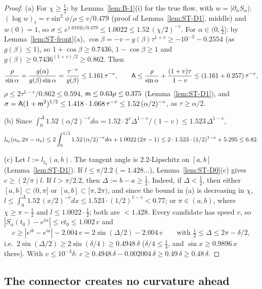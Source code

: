 \begin{proof}
(a) For $\chi\ge\frac12$: by Lemma~\ref{lem:B-1}(i) for the true flow, with $w=|\partial_\alpha S_\alpha|$:
$(\log w)_t=v\sin^2\!\phi/\rho\le v/0.479$ (proof of Lemma~\ref{lem:ST-D1}, middle) and $w(0)=1$, so
$\sigma\le e^{1.0102v/0.479}\le1.0022\le1.52\,(\chi/2)^{-v}$. For $\alpha\in(0,\frac12]$: by Lemma~\ref{lem:ST-front}(a),
$\cos\beta=-v-g(\beta)\tau^{1+v}\ge-10^{-3}-0.2554$ (as $g(\beta)\le1$), so $1+\cos\beta\ge0.7436$, $1-\cos\beta\ge1$ and
$g(\beta)\ge0.7436^{(1+v)/2}\ge0.862$. Then
\[
\frac\rho{\sin\alpha}=\frac{g(\alpha)}{g(\beta)\sin\alpha}=\frac{\tau^{-v}}{g(\beta)}\le1.161\,\tau^{-v},\qquad
\mathsf A\le\frac\rho{\sin\alpha}+\frac{(1+v)\tau}{1-v}\le(1.161+0.257)\,\tau^{-v},
\]
$\rho\le2\tau^{1-v}/0.862\le0.594$, $\mathsf m\le0.63\rho\le0.375$ (Lemma~\ref{lem:ST-D1}), and
$\sigma=\mathsf A(1+\mathsf m^2)^{1/2}\le1.418\cdot1.068\,\tau^{-v}\le1.52\,(\alpha/2)^{-v}$, as $\tau\ge\alpha/2$.

(b) Since $\int_0^\Delta1.52\,(\alpha/2)^{-v}d\alpha=1.52\cdot2^v\Delta^{1-v}/(1-v)\le1.523\,\Delta^{1-v}$,
\[
l_{t_0}(\alpha_{\mathrm s},2\pi-\alpha_{\mathrm s})\le2\int_0^{1/2}1.52\,(\alpha/2)^{-v}d\alpha+1.0022\,(2\pi-1)\le2\cdot1.523\cdot(1/2)^{1-v}+5.295\le6.82 .
\]

(c) Let $l:=l_{t_0}(a,b)$. The tangent angle is $2.2$-Lipschitz on $[a,b]$ (Lemma~\ref{lem:ST-D1}). If $l\le\pi/2.2$
($=1.428\ldots$), Lemma~\ref{lem:ST-D0}(c) gives $c\ge(2/\pi)l$. If $l>\pi/2.2$, then $\Delta:=b-a\ge\frac12$. Indeed, if
$\Delta<\frac12$, then either $[a,b]\subset(0,\pi]$ or $[a,b]\subset[\pi,2\pi)$, and since the bound in (a) is decreasing in $\chi$,
$l\le\int_0^\Delta1.52\,(x/2)^{-v}dx\le1.523\cdot(1/2)^{1-v}<0.77$; or $\pi\in(a,b)$, where $\chi\ge\pi-\frac12$ and
$l\le1.0022\cdot\frac12$; both are $<1.428$. Every candidate has speed $v$, so $|S_\alpha(t_0)-e^{i\alpha}|\le vt_0\le1.002\,v$ and
\[
c\ge|e^{ib}-e^{ia}|-2.004\,v=2\sin(\Delta/2)-2.004\,v\qquad\text{with }\tfrac12\le\Delta\le2\pi-\delta/2,
\]
i.e.\ $2\sin(\Delta/2)\ge2\sin(\delta/4)\ge0.4948\,\delta$ ($\delta/4\le\frac14$, and $\sin x\ge0.9896\,x$ there). With
$v\le10^{-3}\delta$: $c\ge0.4948\,\delta-0.002004\,\delta\ge0.49\,\delta\ge0.48\,\delta$.
\end{proof}

\subsection{The connector creates no curvature ahead}

